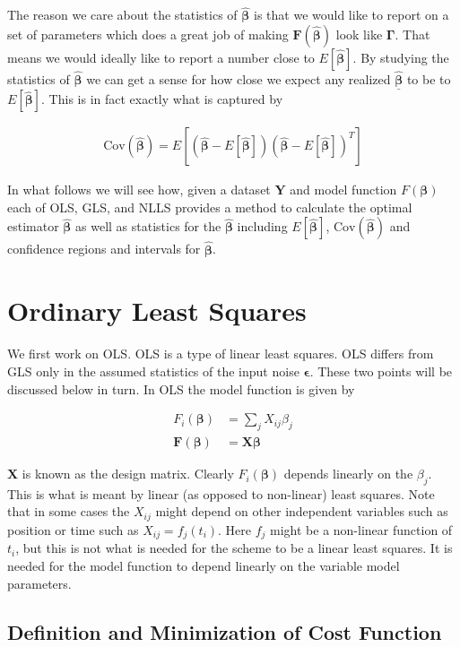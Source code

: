 \documentclass[12pt]{article}
\newcommand{\ep}{\epsilon}
\newcommand{\bv}[1]{\boldsymbol{#1}}
\newcommand{\ul}[1]{\underline{#1}}
\begin{document}
The reason we care about the statistics of $\bv{\hat{\beta}}$ is that we would like to report on a set of parameters which does a great job of making $\bv{F}(\bv{\hat{\beta}})$ look like $\bv{\Gamma}$. 
That means we would ideally like to report a number close to $E[\bv{\hat{\beta}}]$. 
By studying the statistics of $\bv{\hat{\beta}}$ we can get a sense for how close we expect any realized $\ul{\bv{\hat{\beta}}}$ to be to $E[\bv{\hat{\beta}}]$. 
This is in fact exactly what is captured by 

\begin{align}
\text{Cov}(\bv{\hat{\beta}}) = E\left[(\bv{\hat{\beta}} - E[\bv{\hat{\beta}}])(\bv{\hat{\beta}} - E[\bv{\hat{\beta}}])^T\right]
\end{align}

In what follows we will see how, given a dataset $\bv{Y}$ and model function $F(\bv{\beta})$ each of OLS, GLS, and NLLS provides a method to calculate the optimal estimator $\bv{\hat{\beta}}$ as well as statistics for the $\bv{\hat{\beta}}$ including $E[\bv{\hat{\beta}}]$, $\text{Cov}(\bv{\hat{\beta}})$ and confidence regions and intervals for $\bv{\hat{\beta}}$.

\section{Ordinary Least Squares}

We first work on OLS. OLS is a type of linear least squares. OLS differs from GLS only in the assumed statistics of the input noise $\bv{\ep}$.
These two points will be discussed below in turn. In OLS the model function is given by

\begin{align}
F_i(\bv{\beta}) &= \sum_j X_{ij}\beta_j\\
\bv{F}(\bv{\beta}) &= \bv{X}\bv{\beta}
\end{align}

$\bv{X}$ is known as the design matrix. Clearly $F_i(\bv{\beta})$ depends linearly on the $\beta_j$. 
This is what is meant by linear (as opposed to non-linear) least squares.
Note that in some cases the $X_{ij}$ might depend on other independent variables such as position or time such as $X_{ij} = f_j(t_i)$. 
Here $f_j$ might be a non-linear function of $t_i$, but this is not what is needed for the scheme to be a linear least squares. 
It is needed for the model function to depend linearly on the variable model parameters.

\subsection{Definition and Minimization of Cost Function}
\end{document}
